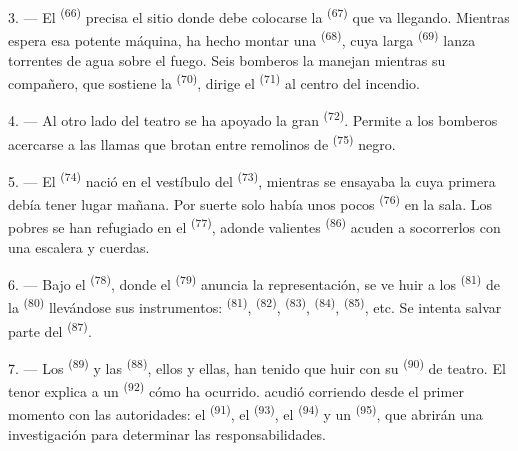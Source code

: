 3. --- El  \textsuperscript{(66)} precisa el sitio donde debe colocarse
la  \textsuperscript{(67)} que va llegando. Mientras espera esa
potente máquina, ha hecho montar una  \textsuperscript{(68)},
cuya larga  \textsuperscript{(69)} lanza torrentes de agua sobre el
fuego. Seis bomberos la manejan mientras su compañero, que sostiene la
 \textsuperscript{(70)}, dirige el  \textsuperscript{(71)} al centro
del incendio.

4. --- Al otro lado del teatro se ha apoyado la gran 
\textsuperscript{(72)}. Permite a los bomberos acercarse a las llamas que brotan
entre remolinos de  \textsuperscript{(75)} negro.

\VUsaut{5.0mm}
\VUsaut{3.4mm}

5. --- El  \textsuperscript{(74)} nació en el vestíbulo del
 \textsuperscript{(73)}, mientras se ensayaba la  cuya
primera  debía tener lugar mañana. Por suerte solo
había unos pocos  \textsuperscript{(76)} en la sala. Los pobres se
han refugiado en el  \textsuperscript{(77)}, adonde valientes
 \textsuperscript{(86)} acuden a socorrerlos con una escalera y
cuerdas.

6. --- Bajo el  \textsuperscript{(78)}, donde el 
\textsuperscript{(79)} anuncia la representación, se ve huir a los 
\textsuperscript{(81)} de la  \textsuperscript{(80)} llevándose sus instrumentos:
 \textsuperscript{(81)},  \textsuperscript{(82)},
 \textsuperscript{(83)},  \textsuperscript{(84)},
 \textsuperscript{(85)}, etc. Se intenta salvar parte del
 \textsuperscript{(87)}.

7. --- Los  \textsuperscript{(89)} y las 
\textsuperscript{(88)},  ellos y ellas, han tenido que huir con su
 \textsuperscript{(90)} de teatro. El tenor explica a un
 \textsuperscript{(92)} cómo ha ocurrido. 
acudió corriendo desde el primer momento con las autoridades: el
 \textsuperscript{(91)}, el  \textsuperscript{(93)}, el
 \textsuperscript{(94)} y un  \textsuperscript{(95)},
que abrirán una investigación para determinar las responsabilidades.
\VUsaut{6.0mm}
\VUfilet{22mm}
